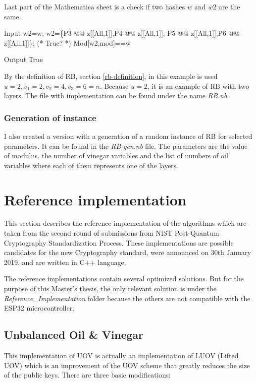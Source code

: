 \documentclass[thesis=M,english]{FITthesis}[2019/12/23]
\begin{document}
\bigskip
\noindent
Last part of the Mathematica sheet is a check if two hashes $w$ and $w2$ are the same.
\begin{mmaCell}[moredefined={w2, w, P5, P6, z, P4, P3, mod}]{Input}
w2=w;
w2=\{P3 @@ z[[All,1]],P4 @@ z[[All,1]],
P5 @@ z[[All,1]],P6 @@ z[[All,1]]\};
(* True? *)
Mod[w2,mod]==w
\end{mmaCell}
\begin{mmaCell}[addtoindex=2]{Output}
True
\end{mmaCell}
By the definition of RB, section \ref{rb-definition}, in this example is used $u=2, v_1=2, v_2=4, v_3=6=n$. Because $u=2$, it is an example of RB with two layers.
The file with implementation can be found under the name \textit{RB.nb}.

\subsubsection{Generation of instance}
I also created a version with a generation of a random instance of RB for selected parameters. It can be found in the \textit{RB-gen.nb} file. The parameters are the value of modulus, the number of vinegar variables and the list of numbers of oil variables where each of them represents one of the layers.

\newpage
\lstset{basicstyle=\footnotesize\ttfamily}
\section{Reference implementation}
This section describes the reference implementation of the algorithms which are taken from the second round of submissions from NIST Post-Quantum Cryptography Standardization Process.\cite{L-NIST-2ND} These implementations are possible candidates for the new Cryptography standard, were announced on 30th January 2019, and are written in C++ language.

\bigskip
\noindent
The reference implementations contain several optimized solutions. But for the purpose of this Master's thesis, the only relevant solution is under the \textit{Reference\_Implementation} folder because the others are not compatible with the ESP32 microcontroller.

\subsection{Unbalanced Oil \& Vinegar}
This implementation of UOV is actually an implementation of LUOV (Lifted UOV) which is an improvement of the UOV scheme that greatly reduces the size of the public keys. There are three basic modifications:
\end{document}
